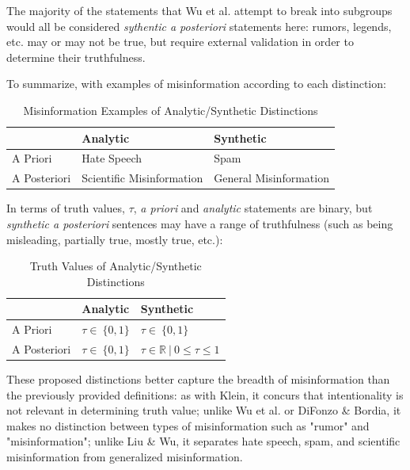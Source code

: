 \documentclass[NETN,manuscript]{stjour-new}
\begin{document}
The majority of the statements that Wu et al. attempt to break into subgroups would all be considered \textit{sythentic a posteriori} statements here: rumors, legends, etc. may or may not be true, but require external validation in order to determine their truthfulness.

To summarize, with examples of misinformation according to each distinction: 
\begin{table}[h!]
    \centering
    \begin{tabular}{ |p{3cm}|p{5cm}|p{5cm}|}
    \hline
    & Analytic & Synthetic\\
    \hline
    A Priori & Hate Speech & Spam\\
    \hline
    A Posteriori &  Scientific Misinformation  & General Misinformation\\
    \hline
    \end{tabular}
    \caption{Misinformation Examples of Analytic/Synthetic Distinctions}
    \label{tab:misinformationexamples}
\end{table}


In terms of truth values, $\tau$, \textit{a priori} and \textit{analytic} statements are binary, but \textit{synthetic a posteriori} sentences may have a range of truthfulness (such as being misleading, partially true, mostly true, etc.):

\begin{table}[h!]
\centering
\begin{tabular}{ |p{3cm}|p{5cm}|p{5cm}|}
 \hline
  & Analytic & Synthetic\\
 \hline
 A Priori & $\tau \in\ \{0,1\}$ & $\tau \in\ \{0,1\}$\\
 \hline
 A Posteriori &  $\tau \in\ \{0,1\}$  & $\tau \in \mathbb{R} \ | \ 0 \leq \tau \leq 1$ \\
 \hline
\end{tabular}
\caption{Truth Values of Analytic/Synthetic Distinctions}
\label{tab:truthvalues}
\end{table}

These proposed distinctions better capture the breadth of misinformation than the previously provided definitions: as with Klein, it concurs that intentionality is not relevant in determining truth value; unlike Wu et al. or DiFonzo \& Bordia, it makes no distinction between types of misinformation such as "rumor" and "misinformation"; unlike Liu \& Wu, it separates hate speech, spam, and scientific misinformation from generalized misinformation. 
\end{document}
